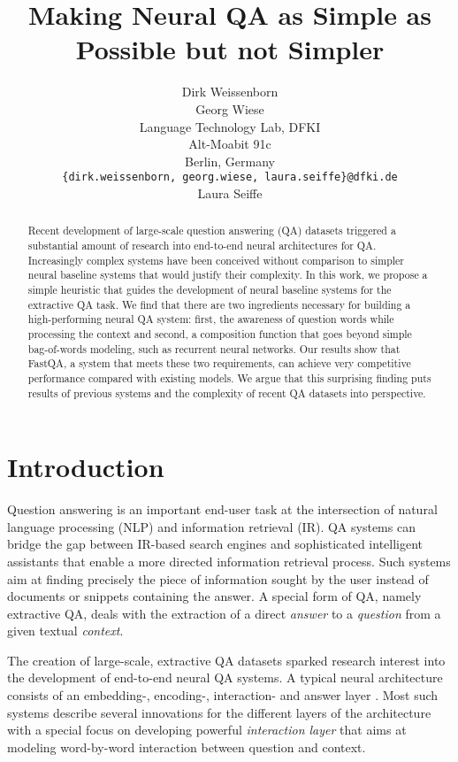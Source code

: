\documentclass[11pt,a4paper]{article}
\title{Making Neural QA as Simple as Possible but not Simpler}
\author{Dirk Weissenborn \\\And
        Georg Wiese \\
	    Language Technology Lab, DFKI \\
	    Alt-Moabit 91c \\
	    Berlin, Germany \\
        {\tt \{dirk.weissenborn, georg.wiese, laura.seiffe\}@dfki.de} \\\And
        Laura Seiffe}
\date{}
\begin{document}
\maketitle
\begin{abstract}
Recent development of large-scale question answering (QA) datasets triggered a substantial amount of research into end-to-end neural architectures for QA. Increasingly complex systems have been conceived without comparison to simpler neural baseline systems that would justify their complexity. In this work, we propose a simple heuristic that guides the development of neural baseline systems for the extractive QA task. We find that there are two ingredients necessary for building a high-performing neural QA system: first, the awareness of question words while processing the context and second, a composition function that goes beyond simple bag-of-words modeling, such as recurrent neural networks. Our results show that FastQA, a system that meets these two requirements, can achieve very competitive performance compared with existing models. We argue that this surprising finding puts results of previous systems and the complexity of recent QA datasets into perspective.
\end{abstract}

\section{Introduction}\label{sec:intro}

Question answering is an important end-user task at the intersection of natural language processing (NLP) and information retrieval (IR). QA systems can bridge the gap between IR-based search engines and sophisticated intelligent assistants that enable a more directed information retrieval process. Such systems aim at finding precisely the piece of information sought by the user instead of documents or snippets containing the answer. A special form of QA, namely extractive QA, deals with the extraction of a direct \textit{answer} to a \textit{question} from a given textual \textit{context}.

The creation of large-scale, extractive QA datasets \cite{Rajpurkar2016,Trischler2017,Nguyen2016} sparked research interest into the development of end-to-end neural QA systems. A typical neural architecture consists of an embedding-, encoding-, interaction- and answer layer \cite{WangJiang2017,Yu2017,Xiong2017,Seo2017,Yang2017,Wang2017}. Most such systems describe several innovations for the different layers of the architecture with a special focus on developing powerful \textit{interaction layer} that aims at modeling word-by-word interaction between question and context.
\end{document}
